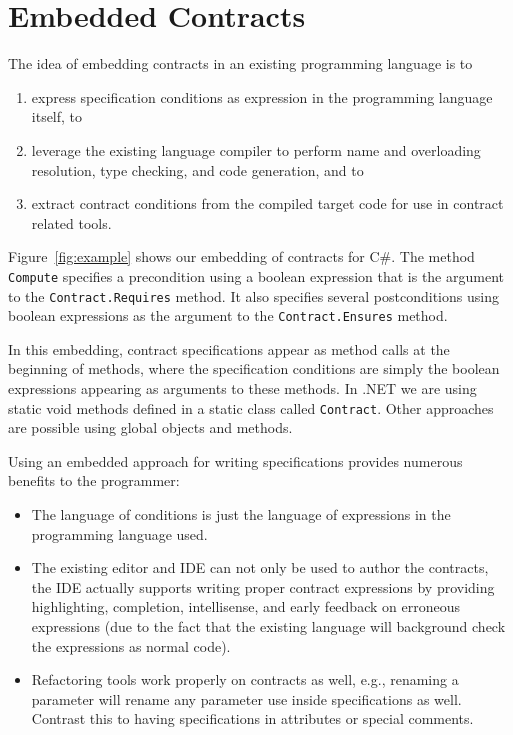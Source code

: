 \documentclass{sig-alternate}
\newcommand{\csharp}{C\#}
\begin{document}
\section{Embedded Contracts}
\label{sec:embeddings}
\noindent
The idea of embedding contracts in an existing programming
language is to
\begin{enumerate}
\item express specification conditions as expression in the
programming language itself, to
\item leverage the existing language
compiler to perform name and overloading resolution, type checking,
and code generation, and to
\item extract contract conditions from the compiled target code for
  use in contract related tools.
\end{enumerate}

\noindent
Figure~\ref{fig:example} shows our embedding of contracts for
\csharp{}. The method \lstinline{Compute} specifies a precondition
using a boolean expression that is the argument to the
\lstinline{Contract.Requires} method. It also specifies several
postconditions using boolean expressions as the argument to the
\lstinline{Contract.Ensures} method.

In this embedding, contract specifications appear as method calls at
the beginning of methods, where the specification conditions are
simply the boolean expressions appearing as arguments to these
methods. In .NET we are using static void methods defined in a static class
called \lstinline{Contract}. Other approaches are possible using
global objects and methods.

Using an embedded approach for writing specifications provides
numerous benefits to the programmer:
\begin{itemize}
\item  The language of conditions is just the language of 
expressions in the programming language used.
\item The existing editor and IDE can not only be used to author the
  contracts, the IDE actually supports writing proper contract
  expressions by providing highlighting, completion, intellisense, and
  early feedback on erroneous expressions (due to the fact that the
  existing language will background check the expressions as normal
  code).
\item Refactoring tools work properly on contracts as well, e.g.,
  renaming a parameter will rename any parameter use inside
  specifications as well. Contrast this to having specifications in
  attributes or special comments.
\end{itemize}
\end{document}
